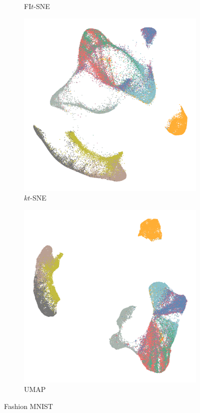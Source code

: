 \begin{appendix}
\begin{figure}[tbp]
\begin{subfigure}{0.45\linewidth}
    \caption{FI$t$-SNE}
\end{subfigure}
\par\bigskip
\begin{subfigure}{0.45\linewidth}
  \centering
    \includegraphics[width=\linewidth]{img/emb/ktsne_fashion_mnist}
    \caption{$kt$-SNE}
\end{subfigure}
  \begin{subfigure}{0.45\linewidth}
    \centering
    \includegraphics[width=\linewidth]{img/emb/umap_fashion_mnist}
    \caption{UMAP}
  \end{subfigure}
  \caption{Fashion MNIST}
\end{figure}


\end{appendix}
